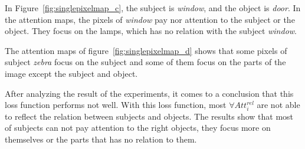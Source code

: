 In Figure~\ref{fig:singlepixelmap_c}, the subject is \textit{window}, and the object is \textit{door}. In the attention maps, the pixels of  \textit{window} pay nor attention to the subject or the object. They focus on the lamps, which has no relation with the subject \textit{window}.

The attention maps of figure~\ref{fig:singlepixelmap_d} shows that some pixels of subject \textit{zebra} focus on the subject and some of them focus on the parts of the image except the subject and object.

After analyzing the result of the experiments, it comes to a conclusion that this loss function performs not well. With this loss function, most $ \forall Att_i^{rel} $ are not able to reflect the relation between subjects and objects. The results show that most of subjects can not pay attention to the right objects, they focus more on themselves or the parts that has no relation to them.




